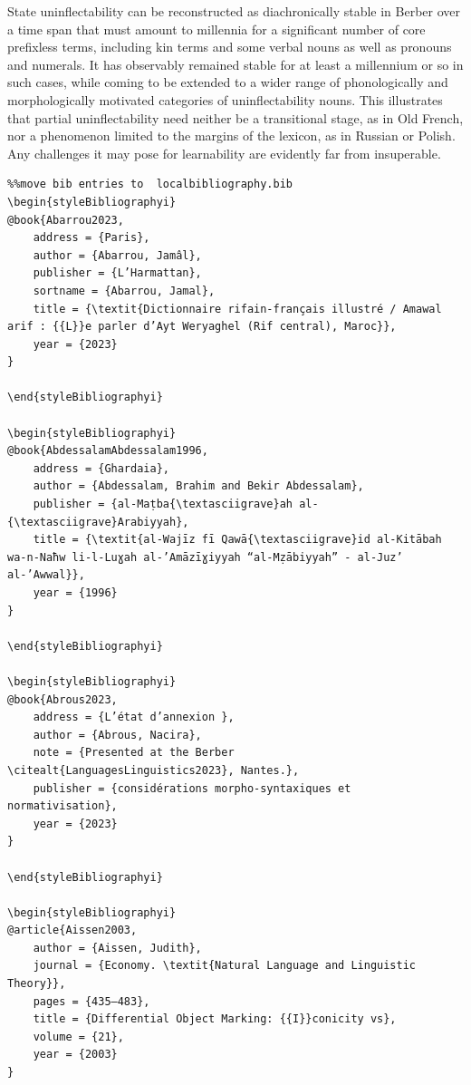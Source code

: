 \documentclass[output=paper]{langscibook}
\begin{document}
\begin{styleStandarduser}
State uninflectability can be reconstructed as diachronically stable in Berber over a time span that must amount to millennia for a significant number of core prefixless terms, including kin terms and some verbal nouns as well as pronouns and numerals. It has observably remained stable for at least a millennium or so in such cases, while coming to be extended to a wider range of phonologically and morphologically motivated categories of uninflectability nouns. This illustrates that partial uninflectability need neither be a transitional stage, as in Old French, nor a phenomenon limited to the margins of the lexicon, as in Russian or Polish. Any challenges it may pose for learnability are evidently far from insuperable.
\end{styleStandarduser}
\begin{verbatim}%%move bib entries to  localbibliography.bib
\begin{styleBibliographyi}
@book{Abarrou2023,
	address = {Paris},
	author = {Abarrou, Jamâl},
	publisher = {L’Harmattan},
	sortname = {Abarrou, Jamal},
	title = {\textit{Dictionnaire rifain-français illustré / Amawal arif : {{L}}e parler d’Ayt Weryaghel (Rif central), Maroc}},
	year = {2023}
}

\end{styleBibliographyi}

\begin{styleBibliographyi}
@book{AbdessalamAbdessalam1996,
	address = {Ghardaia},
	author = {Abdessalam, Brahim and Bekir Abdessalam},
	publisher = {al-Maṭba{\textasciigrave}ah al-{\textasciigrave}Arabiyyah},
	title = {\textit{al-Wajīz fī Qawā{\textasciigrave}id al-Kitābah wa-n-Naħw li-l-Luɣah al-’Amāzīɣiyyah “al-Mẓābiyyah” - al-Juz’ al-’Awwal}},
	year = {1996}
}

\end{styleBibliographyi}

\begin{styleBibliographyi}
@book{Abrous2023,
	address = {L’état d’annexion },
	author = {Abrous, Nacira},
	note = {Presented at the Berber \citealt{LanguagesLinguistics2023}, Nantes.},
	publisher = {considérations morpho-syntaxiques et normativisation},
	year = {2023}
}

\end{styleBibliographyi}

\begin{styleBibliographyi}
@article{Aissen2003,
	author = {Aissen, Judith},
	journal = {Economy. \textit{Natural Language and Linguistic Theory}},
	pages = {435–483},
	title = {Differential Object Marking: {{I}}conicity vs},
	volume = {21},
	year = {2003}
}


\end{verbatim}
\end{document}
